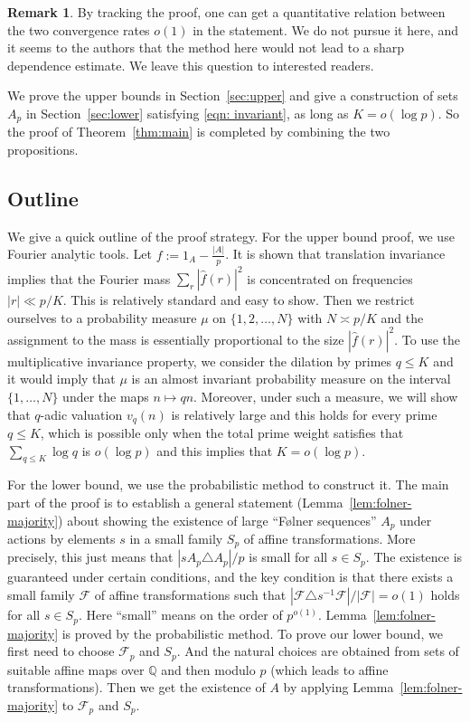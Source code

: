 \documentclass[11pt,letterpaper,reqno]{amsart}
\theoremstyle{definition}
\newtheorem{remark}[theorem]{Remark}
\newcommand{\1}{\mathbf 1}
\begin{document}
\begin{remark}
    By tracking the proof, one can get a quantitative relation between the two convergence rates $o(1)$ in the statement. We do not pursue it here, and it seems to the authors that the method here would not lead to a sharp dependence estimate. We leave this question to interested readers. 
\end{remark}

We prove the upper bounds in Section~\ref{sec:upper} and give a construction of sets $A_p$ in Section~\ref{sec:lower} satisfying \eqref{eqn: invariant}, as long as $K=o(\log p)$. So the proof of Theorem~\ref{thm:main} is completed by combining the two propositions. 


\subsection*{Outline}
We give a quick outline of the proof strategy. For the upper bound proof, we use Fourier analytic tools. Let $f:= 1_A- \frac{|A|}{p}$. 
It is shown that 
translation invariance implies that the Fourier mass
\(\sum_r|\widehat f(r)|^2\) is concentrated on frequencies
\(|r|\ll p/K\).  This is relatively standard and easy to show. Then we restrict ourselves to a probability measure $\mu$ on $\{1, 2, \dots, N\}$ with $N\asymp p/K$ and the assignment to the mass is essentially proportional to the size $|\widehat{f}(r)|^{2}$. 
 To use the multiplicative invariance property, we consider the dilation by primes $q\le K$ and it would imply that $\mu$ is an almost invariant probability
measure on the interval $\{1,\dots,N\}$ under the maps
$n\mapsto qn$.  Moreover, under such a measure, we will show that 
$q$-adic valuation $v_q(n)$ is relatively large and this holds 
for every prime $q\le K$, which is possible only when the total prime weight satisfies that 
$\sum_{q\le K}\log q$ is $o(\log p)$ and this implies that $K=o(\log p)$.

For the lower bound, we use the probabilistic method to construct it. The main part of the proof is to establish a general statement (Lemma~\ref{lem:folner-majority}) about showing the existence of large ``F\o lner sequences'' $A_p$ under actions by elements $s$ in a small family $S_p$ of affine transformations. More precisely, this just means that $|sA_p \triangle A_p|/p$ is small for all $s\in S_p$. The existence is guaranteed under certain conditions, and the key condition is that there exists a small family $\mathcal{F}$ of affine transformations such that $|\mathcal{F} \triangle s^{-1} \mathcal{F}|/|\mathcal{F}|=o(1)$ holds for all $s\in S_p$. Here ``small'' means on the order of $p^{o(1)}$. Lemma~\ref{lem:folner-majority} is proved by the probabilistic method. 
To prove our lower bound, we first need to choose $\mathcal{F}_p$ and $S_p$. And the natural choices are obtained from sets of suitable affine maps over $\mathbb{Q}$ and then modulo $p$ (which leads to affine transformations). Then we get the existence of $A$ by applying Lemma~\ref{lem:folner-majority} to $\mathcal{F}_p$ and $S_p$.   
\end{document}
